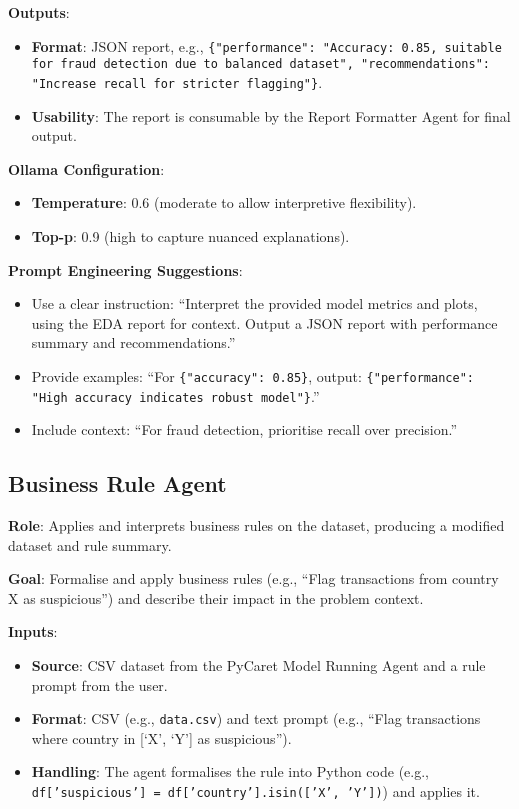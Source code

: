 \documentclass{article}
\begin{document}
\textbf{Outputs}:
\begin{itemize}[label=--]
    \item \textbf{Format}: JSON report, e.g., \texttt{\{"performance": "Accuracy: 0.85, suitable for fraud detection due to balanced dataset", "recommendations": "Increase recall for stricter flagging"\}}.
    \item \textbf{Usability}: The report is consumable by the Report Formatter Agent for final output.
\end{itemize}

\textbf{Ollama Configuration}:
\begin{itemize}[label=--]
    \item \textbf{Temperature}: 0.6 (moderate to allow interpretive flexibility).
    \item \textbf{Top-p}: 0.9 (high to capture nuanced explanations).
\end{itemize}

\textbf{Prompt Engineering Suggestions}:
\begin{itemize}[label=--]
    \item Use a clear instruction: “Interpret the provided model metrics and plots, using the EDA report for context. Output a JSON report with performance summary and recommendations.”
    \item Provide examples: “For \texttt{\{"accuracy": 0.85\}}, output: \texttt{\{"performance": "High accuracy indicates robust model"\}}.”
    \item Include context: “For fraud detection, prioritise recall over precision.”
\end{itemize}

\subsection{Business Rule Agent}

\textbf{Role}: Applies and interprets business rules on the dataset, producing a modified dataset and rule summary.

\textbf{Goal}: Formalise and apply business rules (e.g., “Flag transactions from country X as suspicious”) and describe their impact in the problem context.

\textbf{Inputs}:
\begin{itemize}[label=--]
    \item \textbf{Source}: CSV dataset from the PyCaret Model Running Agent and a rule prompt from the user.
    \item \textbf{Format}: CSV (e.g., \texttt{data.csv}) and text prompt (e.g., “Flag transactions where country in [‘X’, ‘Y’] as suspicious”).
    \item \textbf{Handling}: The agent formalises the rule into Python code (e.g., \texttt{df['suspicious'] = df['country'].isin(['X', 'Y'])}) and applies it.
\end{itemize}
\end{document}
